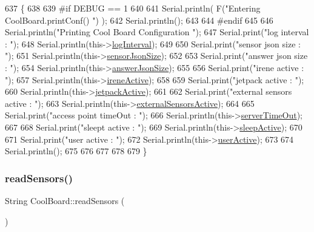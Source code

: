 \begin{DoxyCode}
637 \{
638 
639 \textcolor{preprocessor}{#if DEBUG == 1}
640     
641     Serial.println( F(\textcolor{stringliteral}{"Entering CoolBoard.printConf() "}) );
642     Serial.println();
643 
644 \textcolor{preprocessor}{#endif}
645 
646     Serial.println(\textcolor{stringliteral}{"Printing Cool Board Configuration "});
647     Serial.print(\textcolor{stringliteral}{"log interval      : "});
648     Serial.println(this->\hyperlink{classCoolBoard_a4de0096d575d66b472c4c1f0111fd452}{logInterval});
649 
650     Serial.print(\textcolor{stringliteral}{"sensor json size      : "});
651     Serial.println(this->\hyperlink{classCoolBoard_a58e4b6072e3ac8b141ec0befb479208e}{sensorJsonSize});
652 
653     Serial.print(\textcolor{stringliteral}{"answer json size      : "});
654     Serial.println(this->\hyperlink{classCoolBoard_af2da1f85315b3d074a8b87d158094fb7}{answerJsonSize});
655 
656     Serial.print(\textcolor{stringliteral}{"irene active      : "});
657     Serial.println(this->\hyperlink{classCoolBoard_a9c3f7ac625481ee2ae802a25d97a4ae0}{ireneActive});
658 
659     Serial.print(\textcolor{stringliteral}{"jetpack active        : "});
660     Serial.println(this->\hyperlink{classCoolBoard_a9be03a913d26e558328935ca3b59a75e}{jetpackActive});
661 
662     Serial.print(\textcolor{stringliteral}{"external sensors active   : "});
663     Serial.println(this->\hyperlink{classCoolBoard_a638b00b76aeb819ecfd4c10b8cdd7bb7}{externalSensorsActive});
664 
665     Serial.print(\textcolor{stringliteral}{"access point timeOut  : "});
666     Serial.println(this->\hyperlink{classCoolBoard_a7a8d8d3d316220cdd049cd63c1aa8fe6}{serverTimeOut});
667 
668     Serial.print(\textcolor{stringliteral}{"sleept active         : "});
669     Serial.println(this->\hyperlink{classCoolBoard_a0a51b2287139f66c738101fb53139230}{sleepActive});
670 
671     Serial.print(\textcolor{stringliteral}{"user active       : "});
672     Serial.println(this->\hyperlink{classCoolBoard_a6395459131d6889a3005f79c7a35e964}{userActive});
673 
674     Serial.println();
675 
676 
677 
678 
679 \}
\end{DoxyCode}
\mbox{\label{classCoolBoard_ad03abdce2e65f520bbf2cff0f2d083cf}} 
\subsubsection{\texorpdfstring{read\+Sensors()}{readSensors()}}
{\footnotesize\ttfamily String Cool\+Board\+::read\+Sensors (\begin{DoxyParamCaption}{ }\end{DoxyParamCaption})}

